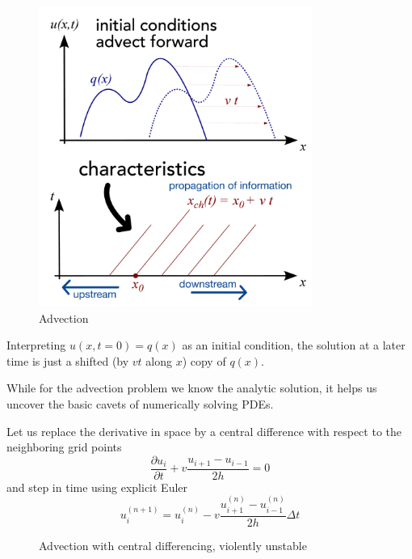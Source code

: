 \begin{figure}[htb!]
    \centering
    \includegraphics[width=0.8\textwidth]{figures/advection.pdf}
    \caption{Advection}
    \label{fig:advection}
\end{figure}

Interpreting $u(x,t = 0) = q(x)$ as an initial condition, the solution at a later time is just a shifted (by $vt$ along $x$) copy of $q(x)$.

While for the advection problem we know the analytic solution, it helps us uncover the basic cavets of numerically solving PDEs.

Let us replace the derivative in space by a central difference with respect to the neighboring grid points
\begin{equation}
    \frac{\partial u_i}{\partial t}+v \frac{u_{i+1}-u_{i-1}}{2 h}=0
\end{equation}
and step in time using explicit Euler
\begin{equation}
    u_i^{(n+1)}=u_i^{(n)}-v \frac{u_{i+1}^{(n)}-u_{i-1}^{(n)}}{2 h} \Delta t
\end{equation}

\begin{figure}[htb!]
    \centering
    
    \caption{Advection with central differencing, violently unstable}
    \label{fig:advection_unstable}
\end{figure}

